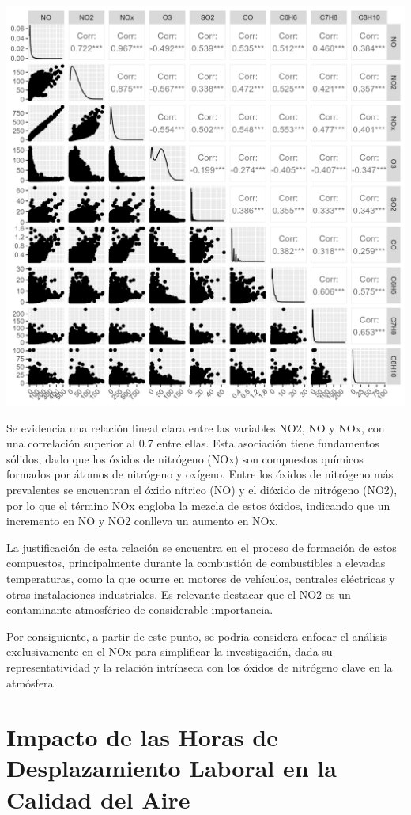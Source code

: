 \documentclass[
]{article}
\begin{document}
\includegraphics[width=29.17in]{grafs/correlation}

Se evidencia una relación lineal clara entre las variables NO2, NO y
NOx, con una correlación superior al 0.7 entre ellas. Esta asociación
tiene fundamentos sólidos, dado que los óxidos de nitrógeno (NOx) son
compuestos químicos formados por átomos de nitrógeno y oxígeno. Entre
los óxidos de nitrógeno más prevalentes se encuentran el óxido nítrico
(NO) y el dióxido de nitrógeno (NO2), por lo que el término NOx engloba
la mezcla de estos óxidos, indicando que un incremento en NO y NO2
conlleva un aumento en NOx.

La justificación de esta relación se encuentra en el proceso de
formación de estos compuestos, principalmente durante la combustión de
combustibles a elevadas temperaturas, como la que ocurre en motores de
vehículos, centrales eléctricas y otras instalaciones industriales. Es
relevante destacar que el NO2 es un contaminante atmosférico de
considerable importancia.

Por consiguiente, a partir de este punto, se podría considera enfocar el
análisis exclusivamente en el NOx para simplificar la investigación,
dada su representatividad y la relación intrínseca con los óxidos de
nitrógeno clave en la atmósfera.

\hypertarget{impacto-de-las-horas-de-desplazamiento-laboral-en-la-calidad-del-aire}{%
\section{Impacto de las Horas de Desplazamiento Laboral en la Calidad
del
Aire}\label{impacto-de-las-horas-de-desplazamiento-laboral-en-la-calidad-del-aire}}
\end{document}
